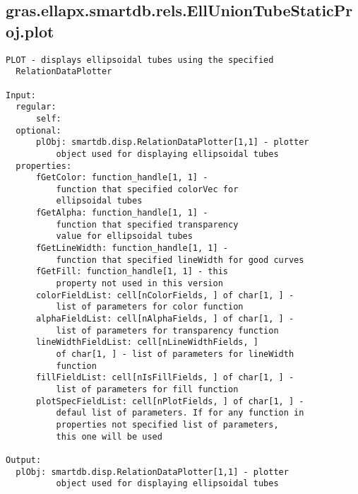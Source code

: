 \subsection{\texorpdfstring{gras.ellapx.smartdb.rels.EllUnionTubeStaticProj.plot}{plot}}\label{method:gras.ellapx.smartdb.rels.EllUnionTubeStaticProj.plot}
\begin{verbatim}
PLOT - displays ellipsoidal tubes using the specified
  RelationDataPlotter

Input:
  regular:
      self:
  optional:
      plObj: smartdb.disp.RelationDataPlotter[1,1] - plotter
          object used for displaying ellipsoidal tubes
  properties:
      fGetColor: function_handle[1, 1] -
          function that specified colorVec for
          ellipsoidal tubes
      fGetAlpha: function_handle[1, 1] -
          function that specified transparency
          value for ellipsoidal tubes
      fGetLineWidth: function_handle[1, 1] -
          function that specified lineWidth for good curves
      fGetFill: function_handle[1, 1] - this
          property not used in this version
      colorFieldList: cell[nColorFields, ] of char[1, ] -
          list of parameters for color function
      alphaFieldList: cell[nAlphaFields, ] of char[1, ] -
          list of parameters for transparency function
      lineWidthFieldList: cell[nLineWidthFields, ]
          of char[1, ] - list of parameters for lineWidth
          function
      fillFieldList: cell[nIsFillFields, ] of char[1, ] -
          list of parameters for fill function
      plotSpecFieldList: cell[nPlotFields, ] of char[1, ] -
          defaul list of parameters. If for any function in
          properties not specified list of parameters,
          this one will be used

Output:
  plObj: smartdb.disp.RelationDataPlotter[1,1] - plotter
          object used for displaying ellipsoidal tubes
\end{verbatim}
